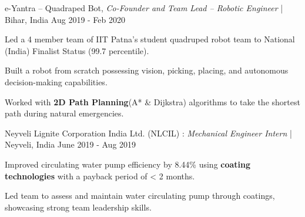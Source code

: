 \begin{cventries2}
  \cventrynew
    { e-Yantra -- Quadraped Bot, \textnormal{\textit{Co-Founder and Team Lead -- Robotic Engineer} | Bihar, India}} %
    {Aug 2019 - Feb 2020} %
    {
      \begin{cvitems} %
        \item {Led a 4 member team of IIT Patna’s student quadruped robot team to National (India) Finalist Status (99.7 percentile).} 
        \item {Built a robot from scratch possessing vision, picking, placing, and autonomous decision-making capabilities.}
        \item {Worked with {\bf 2D Path Planning}(A* \& Dijkstra) algorithms to take the shortest path during natural emergencies.}
      \end{cvitems}
    }



  \cventrynew
    {Neyveli Lignite Corporation India Ltd. (NLCIL) : \textnormal{\textit{Mechanical Engineer Intern} | Neyveli, India}} %
    {June 2019 - Aug 2019} %
    {
      \begin{cvitems} %
        \item {Improved circulating water pump efficiency by 8.44\% using {\bf coating technologies} with a payback period of < 2 months.} 
        \item {Led team to assess and maintain water circulating pump through coatings, showcasing strong team leadership skills.}
      \end{cvitems}
      }

\end{cventries2}
